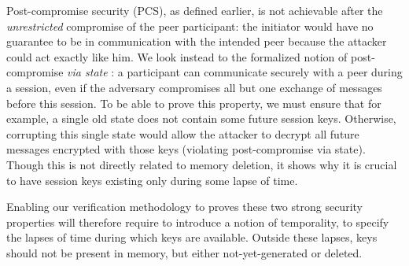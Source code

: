 \documentclass{article}
\newcommand{\TODO}[1]{\textcolor{RedViolet}{\textbf{TODO:} #1}}
\begin{document}
Post-compromise security (PCS), as defined earlier, is not achievable after the \textit{unrestricted} compromise of the peer participant: the initiator would have no guarantee to be in communication with the intended peer because the attacker could act exactly like him.
We look instead to the formalized notion of post-compromise \textit{via state} \cite{7536374}: a participant can communicate securely with a peer during a session, even if the adversary compromises all but one exchange of messages before this session.
To be able to prove this property, we must ensure that for example, a single old state does not contain some future session keys. Otherwise, corrupting this single state would allow the attacker to decrypt all future messages encrypted with those keys (violating post-compromise via state). Though this is not directly related to memory deletion, it shows why it is crucial to have session keys existing only during some lapse of time.

Enabling our verification methodology to proves these two strong security properties will therefore require to introduce a notion of temporality, to specify the lapses of time during which keys are available. Outside these lapses, keys should not be present in memory, but either not-yet-generated or deleted.




\end{document}

